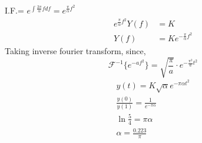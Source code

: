\documentclass[journal,12pt,twocolumn]{IEEEtran}
\theoremstyle{remark}
\begin{document}
I.F.= $e^{\int\frac{2\pi}{\alpha} f df} = e^{\frac{\pi}{\alpha} f^2}$
\begin{align}
    e^{\frac{\pi}{\alpha} f^2} Y(f) &= K\\
    Y(f) &= K e^{-\frac{\pi}{\alpha} f^2}
\end{align}
Taking inverse fourier transform,
since, \[ \mathcal{F}^{-1}\{e^{-af^2}\} = \sqrt{\frac{\pi}{a}} \cdot e^{-\frac{\pi^2}{a}t^2} \]
\begin{align}
    y(t) = K \sqrt{\alpha} e^{-\pi\alpha t^2}\\
    \frac{y(0)}{y(1)} = \frac{1}{e^{-\pi\alpha}}\\
    \ln\frac{5}{4} = \pi \alpha \\
    \alpha = \frac{0.223}{\pi} 
\end{align}
\end{document}
